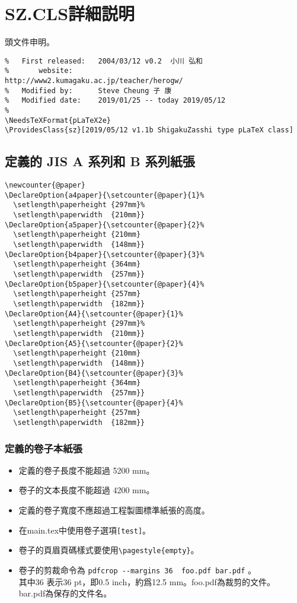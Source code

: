 \section{SZ.CLS詳細説明}
\par 頭文件申明。
\begin{lstlisting}[firstnumber=1]
%   File:             ShigakuZasshi type pLaTeX class
%   First released:   2004/03/12 v0.2  小川 弘和
%		website:					http://www2.kumagaku.ac.jp/teacher/herogw/
%   Modified by:      Steve Cheung 子 康
%   Modified date:    2019/01/25 -- today 2019/05/12
%
\NeedsTeXFormat{pLaTeX2e}
\ProvidesClass{sz}[2019/05/12 v1.1b ShigakuZasshi type pLaTeX class]
\end{lstlisting}

\subsection{定義的 JIS A 系列和 B 系列紙張}
\begin{lstlisting}[firstnumber=11]
\newcounter{@paper}
\DeclareOption{a4paper}{\setcounter{@paper}{1}%
  \setlength\paperheight {297mm}%
  \setlength\paperwidth  {210mm}}
\DeclareOption{a5paper}{\setcounter{@paper}{2}%
  \setlength\paperheight {210mm}
  \setlength\paperwidth  {148mm}}
\DeclareOption{b4paper}{\setcounter{@paper}{3}%
  \setlength\paperheight {364mm}
  \setlength\paperwidth  {257mm}}
\DeclareOption{b5paper}{\setcounter{@paper}{4}%
  \setlength\paperheight {257mm}
  \setlength\paperwidth  {182mm}}
\DeclareOption{A4}{\setcounter{@paper}{1}%
  \setlength\paperheight {297mm}%
  \setlength\paperwidth  {210mm}}
\DeclareOption{A5}{\setcounter{@paper}{2}%
  \setlength\paperheight {210mm}
  \setlength\paperwidth  {148mm}}
\DeclareOption{B4}{\setcounter{@paper}{3}%
  \setlength\paperheight {364mm}
  \setlength\paperwidth  {257mm}}
\DeclareOption{B5}{\setcounter{@paper}{4}%
  \setlength\paperheight {257mm}
  \setlength\paperwidth  {182mm}}
\end{lstlisting}

\subsubsection{定義的卷子本紙張}
\par{}
\begin{itemize}
\item 定義的卷子長度不能超過 5200 mm。
\item 卷子的文本長度不能超過 4200 mm。
\item 定義的卷子寬度不應超過工程製圖標準紙張的高度。
\item	在main.tex中使用卷子選項\verb+[test]+。
\item 卷子的頁眉頁碼樣式要使用\verb+\pagestyle{empty}+。
\item 卷子的剪裁命令為 {\color{red}\verb+pdfcrop --margins 36  foo.pdf bar.pdf+} 。\\
其中36 表示36 pt，即0.5 inch，約爲12.5 mm。foo.pdf為裁剪的文件。
bar.pdf為保存的文件名。
\end{itemize}

